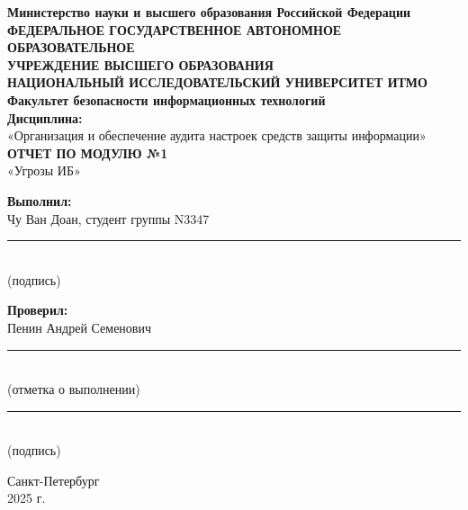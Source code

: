 \documentclass[a4paper,12pt]{article}
\begin{document}
	
	\onehalfspacing %
	
	\begin{center}
		\textbf{Министерство науки и высшего образования Российской Федерации} \\
		\textbf{ФЕДЕРАЛЬНОЕ ГОСУДАРСТВЕННОЕ АВТОНОМНОЕ ОБРАЗОВАТЕЛЬНОЕ} \\
		\textbf{УЧРЕЖДЕНИЕ ВЫСШЕГО ОБРАЗОВАНИЯ} \\
		\textbf{НАЦИОНАЛЬНЫЙ ИССЛЕДОВАТЕЛЬСКИЙ УНИВЕРСИТЕТ ИТМО} \\
		\vspace{1cm}
		\textbf{Факультет безопасности информационных технологий} \\
		\vspace{0.5cm}
		\textbf{Дисциплина:} \\
		«Организация и обеспечение аудита настроек средств защиты информации» \\
		\vspace{1cm}
		\textbf{ОТЧЕТ ПО МОДУЛЮ №1} \\
		«Угрозы ИБ» \\
	\end{center}
	
	\vspace{1.5cm} %
	
	\begin{flushright}
		\textbf{Выполнил:} \\
		Чу Ван Доан, студент группы N3347 \\
		\vspace{1cm}
		\rule{5cm}{0.4pt} \\ (подпись)
	\end{flushright}
	
	\vspace{1cm}
	
	\begin{flushright}
		\textbf{Проверил:} \\
		Пенин Андрей Семенович \\
		\vspace{1cm}
		\rule{10cm}{0.4pt} \\ (отметка о выполнении) \\
		\vspace{0.5cm}
		\rule{5cm}{0.4pt} \\ (подпись)
	\end{flushright}
	
	\vfill
	
	\begin{center}
		Санкт-Петербург \\
		2025 г.
	\end{center}
	
\end{document}
